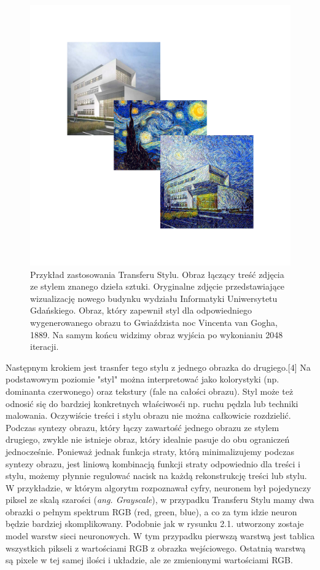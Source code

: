 \documentclass[openright]{xmgr}
\begin{document}
 
 \begin{figure}[!tbh]
\centering
\includegraphics[width=.8\hsize]{fig/6}
\caption{Przykład zastosowania Transferu Stylu.
Obraz łączący treść zdjęcia ze stylem znanego dzieła sztuki. Oryginalne zdjęcie przedstawiające wizualizację nowego budynku wydziału Informatyki Uniwersytetu Gdańskiego. Obraz, który zapewnił styl dla odpowiedniego wygenerowanego obrazu to  Gwiaździsta noc Vincenta van Gogha, 1889. Na samym końcu widzimy obraz wyjścia po wykonianiu 2048 iteracji.
\label{RYS.6}}
\end{figure}

  
  
Następnym krokiem jest trasnfer tego stylu z jednego obrazka do drugiego.[4] Na podstawowym poziomie "styl" można interpretować jako kolorystyki (np. dominanta czerwonego) oraz tekstury (fale na całości obrazu). Styl może też odnosić się do bardziej konkretnych właściwosći np. ruchu pędzla lub techniki malowania. Oczywiście treści i stylu obrazu nie można całkowicie rozdzielić. Podczas syntezy obrazu, który łączy zawartość jednego obrazu ze stylem drugiego, zwykle nie istnieje obraz, który idealnie pasuje do obu ograniczeń jednocześnie. Ponieważ jednak funkcja straty, którą minimalizujemy podczas syntezy obrazu, jest liniową kombinacją funkcji straty odpowiednio dla treści i stylu, możemy płynnie regulować nacisk na każdą rekonstrukcję treści lub stylu. W przykładzie, w którym algorytm rozpoznawał cyfry, neuronem był pojedynczy piksel ze skalą szarości (\textit{ang. Grayscale}), w przypadku Transferu Stylu mamy dwa obrazki o pełnym  spektrum RGB (red, green, blue), a co za tym idzie neuron będzie bardziej skomplikowany. Podobnie jak w rysunku 2.1. utworzony zostaje model warstw sieci neuronowych. W tym przypadku pierwszą warstwą jest tablica wszystkich pikseli z wartościami RGB z obrazka wejściowego. Ostatnią warstwą  są pixele w tej samej ilości i układzie, ale ze zmienionymi wartościami RGB. 
\end{document}
